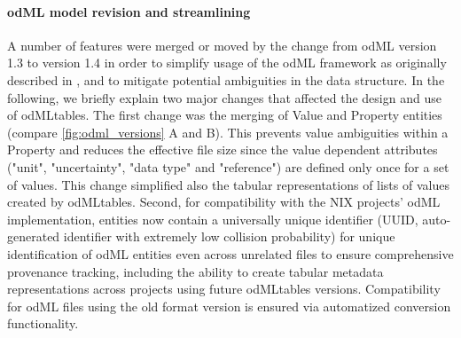{\paragraph{odML model revision and streamlining}
\label{sec:odml_model_revision}
A number of features were merged or moved by the change from odML version 1.3 to version 1.4 in order to simplify usage of the odML framework as originally described in \citet{Grewe_2011}, and to mitigate potential ambiguities in the data structure. In the following, we briefly explain two major changes that affected the design and use of odMLtables. The first change was the merging of Value and Property entities (compare \cref{fig:odml_versions} A and B). This prevents value ambiguities within a Property and reduces the effective file size since the value dependent attributes ("unit", "uncertainty", "data type" and "reference") are defined only once for a set of values. This change simplified also the tabular representations of lists of values created by odMLtables. Second, for compatibility with the NIX projects' odML implementation, entities now contain a universally unique identifier (UUID, auto-generated identifier with extremely low collision probability) for unique identification of odML entities even across unrelated files to ensure comprehensive provenance tracking, including the ability to create tabular metadata representations across projects using future odMLtables versions. Compatibility for odML files using the old format version is ensured via automatized conversion functionality.

}
